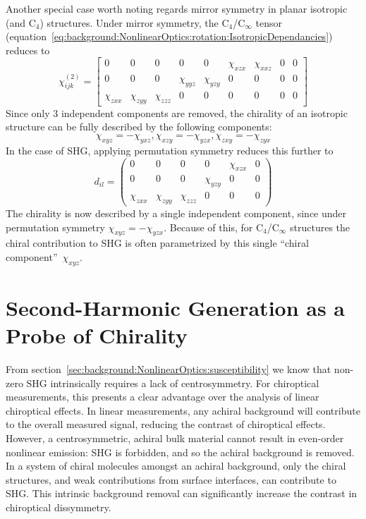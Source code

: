 Another special case worth noting regards mirror symmetry in planar isotropic (and C$_4$) structures. Under mirror symmetry, the C$_4$/C$_\infty$ tensor (equation~\ref{eq:background:NonlinearOptics:rotation:IsotropicDependancies}) reduces to
\begin{equation}\label{eq:background:NonlinearOptics:mirror:IsotropicMirrorChi}
	\chi^{(2)}_{ijk} =
	\begin{bmatrix}
		0 & 0 & 0 & 0 & 0 & \chi_{xzx} & \chi_{xxz} & 0 & 0\\ 
		0 & 0 & 0 & \chi_{yyz} & \chi_{yzy} & 0 & 0 & 0 & 0\\ 
		\chi_{zxx} & \chi_{zyy} & \chi_{zzz} & 0 & 0 & 0 & 0 & 0 & 0
	\end{bmatrix}
\end{equation}
Since only 3 independent components are removed, the chirality of an isotropic structure can be fully described by the following components:
\begin{equation}\label{eq:background:NonlinearOptics:mirror:IsoChiralComponents}
\chi_{xyz} = -\chi_{yxz}, \chi_{xzy} = -\chi_{yzx}, \chi_{zxy} = -\chi_{zyx} 
\end{equation}
In the case of SHG, applying permutation symmetry reduces this further to
\begin{equation}\label{eq:background:NonlinearOptics:mirror:ReducedIsoChiral}
	d_{il} = 
	\begin{pmatrix}
		0 & 0 & 0 & 0 & \chi_{xzx} & 0\\ 
		0 & 0 & 0 & \chi_{yzy} & 0 & 0\\ 
		\chi_{zxx} & \chi_{zyy} & \chi_{zzz} & 0 & 0 & 0
	\end{pmatrix} 
\end{equation}
The chirality is now described by a single independent component, since under permutation symmetry $\chi_{xyz} = -\chi_{yzx}$. Because of this, for C$_4$/C$_\infty$ structures the chiral contribution to SHG is often parametrized by this single ``chiral component''~$\chi_{xyz}$.

\section{Second-Harmonic Generation as a Probe of Chirality}\label{sec:background:NonlinearOptics:chirality}

From section~\ref{sec:background:NonlinearOptics:susceptibility} we know that non-zero SHG intrinsically requires a lack of centrosymmetry. For chiroptical measurements, this presents a clear advantage over the analysis of linear chiroptical effects. In linear measurements, any achiral background will contribute to the overall measured signal, reducing the contrast of chiroptical effects. However, a centrosymmetric, achiral bulk material cannot result in even-order nonlinear emission: SHG is forbidden, and so the achiral background is removed. In a system of chiral molecules amongst an achiral background, only the chiral structures, and weak contributions from surface interfaces, can contribute to SHG. This intrinsic background removal can significantly increase the contrast in chiroptical dissymmetry.

